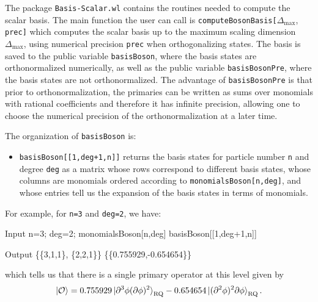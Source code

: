 \documentclass[12pt]{article}
\newcommand{\be}{\begin{eqnarray}}
\newcommand{\ee}{\end{eqnarray}}
\newcommand{\CO}{{\cal O}}
\newcommand\De\Delta
\newcommand{\p}{\partial}
\newcommand{\Dmax}{\De_{\max}}
\newcommand{\rket}[1]{\ket{#1}_{\rm RQ}}
\begin{document}
The package  {\tt Basis-Scalar.wl} contains the routines needed to compute the scalar basis. The main function the user can call is {\tt computeBosonBasis[}$\Delta_{\textrm{max} } $, {\tt prec]} which computes the scalar basis up to the maximum scaling dimension $\Dmax$, using numerical precision {\tt prec} when orthogonalizing states.
The basis is saved to the public variable {\tt basisBoson}, where the basis states are orthonormalized numerically, as well as the public variable {\tt basisBosonPre}, where the basis states are not orthonormalized.  The advantage of {\tt basisBosonPre} is that prior to orthonormalization, the primaries can be written as sums over monomials with rational coefficients and therefore it has infinite precision, allowing one to choose the numerical precision  of the orthonormalization at a later time.

The organization of {\tt basisBoson} is:
\begin{itemize}
\item {\tt basisBoson[[1,deg+1,n]]} returns the basis states for particle number {\tt n} and degree {\tt deg} as a matrix whose rows correspond to different basis states, whose columns are monomials ordered according to {\tt monomialsBoson[n,deg]}, and whose entries tell us the expansion of the basis states in terms of monomials. 
\end{itemize}
For example, for {\tt n=3} and {\tt deg=2}, we have:
\begin{mmaCell}[moredefined={monomialsBoson,basisBoson}]{Input}
  n=3; deg=2; 
  monomialsBoson[n,deg]
  basisBoson[[1,deg+1,n]]
\end{mmaCell}
\begin{mmaCell}{Output}
  \{\{3,1,1\}, \{2,2,1\}\}
  \{\{0.755929,-0.654654\}\}
\end{mmaCell}
which tells us that there is a single primary operator at this level given by 
\be
\ket{\CO} = 0.755929 \rket{ \p^3 \phi (\p\phi)^2 } -0.654654 \rket{ (\p^2 \phi)^2 \p\phi}  . 
\label{eq:ExampleScalarPrimary}
\ee
\end{document}
